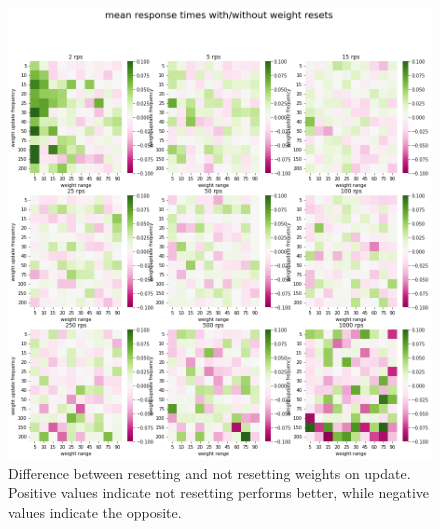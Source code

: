\begin{figure}
    \centering
    \includegraphics[width=14cm]{graphics/graphs/lb_hyper_weight_reset_delta.png}
    \caption{Difference between resetting and not resetting weights on update. Positive values indicate not resetting performs better, while negative values indicate the opposite.}
    \label{fig:lb_hyper_reset_delta}
\end{figure}

